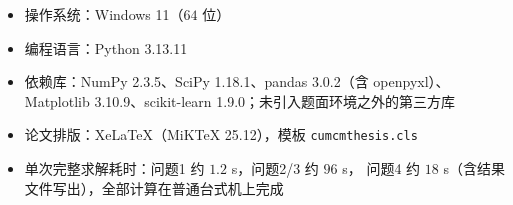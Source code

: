 \begin{itemize}
  \item 操作系统：Windows 11（$64$ 位）
  \item 编程语言：Python 3.13.11
  \item 依赖库：NumPy 2.3.5、SciPy 1.18.1、pandas 3.0.2（含 openpyxl）、
  Matplotlib 3.10.9、scikit-learn 1.9.0；未引入题面环境之外的第三方库
  \item 论文排版：XeLaTeX（MiKTeX 25.12），模板 \texttt{cumcmthesis.cls}
  \item 单次完整求解耗时：问题1 约 $1.2$ s，问题2/3 约 $96$ s，
  问题4 约 $18$ s（含结果文件写出），全部计算在普通台式机上完成
\end{itemize}
